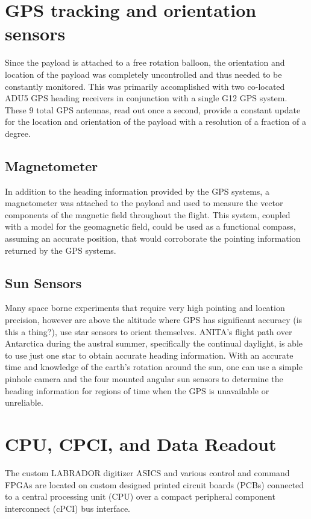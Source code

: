 	
\section{GPS tracking and orientation sensors}
	Since the payload is attached to a free rotation balloon, the orientation and location of the payload was completely uncontrolled and thus needed to be constantly monitored.  This was primarily accomplished with two co-located ADU5 GPS heading receivers in conjunction with a single G12 GPS system.  These 9 total GPS antennas, read out once a second, provide a constant update for the location and orientation of the payload with a resolution of a fraction of a degree.
	
	\subsection{Magnetometer}
		In addition to the heading information provided by the GPS systems, a magnetometer was attached to the payload and used to measure the vector components of the magnetic field throughout the flight.  This system, coupled with a model for the geomagnetic field, could be used as a functional compass, assuming an accurate position, that would corroborate the pointing information returned by the GPS systems.
		
	\subsection{Sun Sensors}
		Many space borne experiments that require very high pointing and location precision, however are above the altitude where GPS has significant accuracy (is this a thing?), use star sensors to orient themselves.  ANITA's flight path over Antarctica during the austral summer, specifically the continual daylight, is able to use just one star to obtain accurate heading information.  With an accurate time and knowledge of the earth's rotation around the sun, one can use a simple pinhole camera and the four mounted angular sun sensors to determine the heading information for regions of time when the GPS is unavailable or unreliable.
		
\section{CPU, CPCI, and Data Readout}
	The custom LABRADOR digitizer ASICS and various control and command FPGAs are located on custom designed printed circuit boards (PCBs) connected to a central processing unit (CPU) over a compact peripheral component interconnect (cPCI) bus interface.  
	
